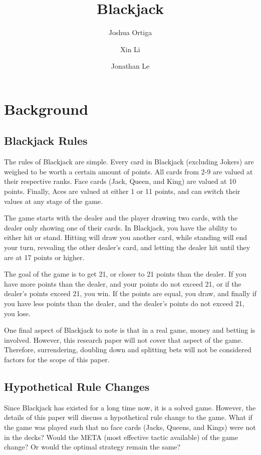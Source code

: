 \documentclass{article}
\title{Blackjack}
\author{Joshua Ortiga \\
\and
Xin Li \\
\and
Jonathan Le}
\begin{document}
\maketitle
\section{Background}
\label{sec: Background}

	\subsection{Blackjack Rules}
	\label{sec: Blackjack Rules}

		The rules of Blackjack are simple. Every card in Blackjack (excluding Jokers) are weighed to be worth a certain
		amount of points. All cards from 2-9 are valued at their respective ranks. Face cards (Jack, Queen, and King) 
		are valued at 10 points. Finally, Aces are valued at either 1 or 11 points, and can switch their values at
		any stage of the game. 

		The game starts with the dealer and the player drawing two cards, with the dealer only showing one of their cards.
		In Blackjack, you have the ability to either hit or stand. Hitting will draw you another card, while standing will 
		end your turn, revealing the other dealer's card, and letting the dealer hit until they are at 17 points or higher.

		The goal of the game is to get 21, or closer to 21 points than the dealer. If you have more points than the dealer,
		and your points do not exceed 21, or if the dealer's points exceed 21, you win. If the points are equal, you draw, 
		and finally if you have less points than the dealer, and the dealer's points do not exceed 21, you lose.

		One final aspect of Blackjack to note is that in a real game, money and betting is involved. However, this research paper
		will not cover that aspect of the game. Therefore, surrendering, doubling down and splitting bets will not be considered
		factors for the scope of this paper.

	\subsection{Hypothetical Rule Changes}
	\label{sec: Hypothetical Rule Changes}

		Since Blackjack has existed for a long time now, it is a solved game. However, the details of this paper will discuss a hypothetical rule
		change to the game. What if the game was played such that no face cards (Jacks, Queens, and Kings) were not in the decks? Would
		the META (most effective tactic available) of the game change? Or would the optimal strategy remain the same?
\end{document}
